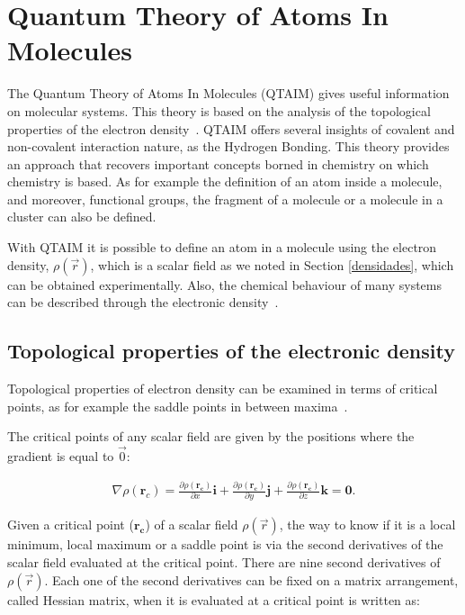 \section{Quantum Theory of Atoms In Molecules}

The Quantum Theory of Atoms In Molecules (\gls{QTAIM}) gives useful information
on molecular systems. This theory is based on the analysis of the topological
properties of the electron density~\cite{bader}. QTAIM offers several insights
of covalent and non-covalent interaction nature, as the Hydrogen Bonding. This
theory provides an approach that recovers important concepts borned in
chemistry on which chemistry is based. As for example the definition of an atom
inside a molecule, and moreover, functional groups, the fragment of a molecule
or a molecule in a cluster can also be defined.

With QTAIM it is possible to define an atom in a molecule using the
electron density, $\rho(\vec{r})$, which is a scalar field as we noted in
Section \ref{densidades}, which can be obtained experimentally. Also, the
chemical behaviour of many systems can be described through the electronic
density~\cite{bader,matta}.


\subsection{Topological properties of the electronic density}

Topological properties of
electron density can be examined in terms of critical points, as for example
the saddle points in between maxima~\cite{bader,coppens,matta}.

The critical points
of any scalar field are given by the positions where
the gradient is equal to $\vec{0}$:

\begin{align}
\nabla\rho(\mathbf{r}_{c})= \frac{\partial\rho(\mathbf{r_{c}})}{\partial x}\mathbf{i} +
\frac{\partial\rho(\mathbf{r_{c}})}{\partial y}\mathbf{j} +
\frac{\partial\rho(\mathbf{r_{c}})}{\partial z}\mathbf{k} = \mathbf{0} .
\end{align}

Given a critical point ($\mathbf{r_{c}}$) of a scalar field $\rho(\vec{r})$,
the way to know if it is a local minimum, local maximum or a saddle point is
via the second derivatives of the scalar field evaluated at the critical
point. There are nine second derivatives of $\rho(\vec{r})$. Each one of the
second derivatives can be fixed on a matrix arrangement, called Hessian matrix,
when it is evaluated at a critical point is written as:


